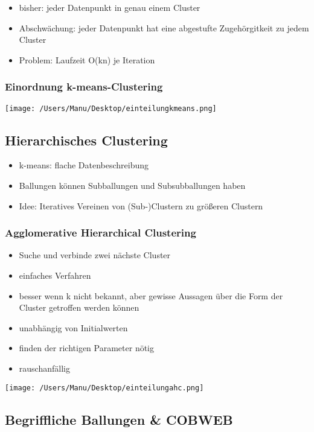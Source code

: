 \documentclass[paper=a4, fontsize=11pt]{scrartcl} %
\numberwithin{equation}{section} %
\numberwithin{figure}{section} %
\numberwithin{table}{section} %
\begin{document}
\begin{itemize}
\item bisher: jeder Datenpunkt in genau einem Cluster
\item Abschwächung: jeder Datenpunkt hat eine abgestufte Zugehörgitkeit zu jedem Cluster
\item Problem: Laufzeit O(kn) je Iteration
\end{itemize}

\subsubsection{Einordnung k-means-Clustering}

\texttt{[image: /Users/Manu/Desktop/einteilungkmeans.png]}

\subsection{Hierarchisches Clustering}

\begin{itemize}
\item k-means: flache Datenbeschreibung
\item Ballungen können Subballungen und Subsubballungen haben
\item Idee: Iteratives Vereinen von (Sub-)Clustern zu größeren Clustern
\end{itemize}

\subsubsection{Agglomerative Hierarchical Clustering}

\begin{itemize}
\item Suche und verbinde zwei nächste Cluster
\item einfaches Verfahren
\item besser wenn k nicht bekannt, aber gewisse Aussagen über die Form der Cluster getroffen werden können
\item unabhängig von Initialwerten
\item finden der richtigen Parameter nötig
\item rauschanfällig
\end{itemize}

\texttt{[image: /Users/Manu/Desktop/einteilungahc.png]}

\subsection{Begriffliche Ballungen \& COBWEB}
\end{document}
